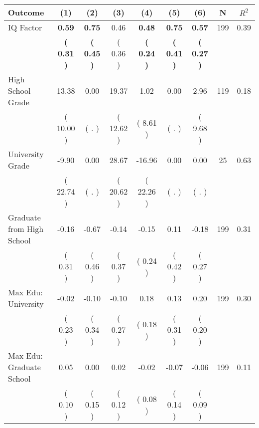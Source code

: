 \begin{tabular}{lcccccccc}
\toprule
 \textbf{Outcome} & \textbf{(1)} & \textbf{(2)} & \textbf{(3)} & \textbf{(4)} & \textbf{(5)} & \textbf{(6)} & \textbf{N} & \textbf{$ R^2$} \\
\midrule
IQ Factor & \textbf{     0.59} & \textbf{     0.75} &      0.46 & \textbf{     0.48} & \textbf{     0.75} & \textbf{     0.57} & 199 &       0.39 \\ 
 & \textbf{(     0.31 )} & \textbf{(     0.45 )} & (     0.36 ) & \textbf{(     0.24 )} & \textbf{(     0.41 )} & \textbf{(     0.27 )} & \\
High School Grade &     13.38 &      0.00 &     19.37 &      1.02 &      0.00 &      2.96 & 119 &       0.18 \\ 
 & (    10.00 ) & (        . ) & (    12.62 ) & (     8.61 ) & (        . ) & (     9.68 ) & \\
University Grade &     -9.90 &      0.00 &     28.67 &    -16.96 &      0.00 &      0.00 & 25 &       0.63 \\ 
 & (    22.74 ) & (        . ) & (    20.62 ) & (    22.26 ) & (        . ) & (        . ) & \\
Graduate from High School &     -0.16 &     -0.67 &     -0.14 &     -0.15 &      0.11 &     -0.18 & 199 &       0.31 \\ 
 & (     0.31 ) & (     0.46 ) & (     0.37 ) & (     0.24 ) & (     0.42 ) & (     0.27 ) & \\
Max Edu: University &     -0.02 &     -0.10 &     -0.10 &      0.18 &      0.13 &      0.20 & 199 &       0.30 \\ 
 & (     0.23 ) & (     0.34 ) & (     0.27 ) & (     0.18 ) & (     0.31 ) & (     0.20 ) & \\
Max Edu: Graduate School &      0.05 &      0.00 &      0.02 &     -0.02 &     -0.07 &     -0.06 & 199 &       0.11 \\ 
 & (     0.10 ) & (     0.15 ) & (     0.12 ) & (     0.08 ) & (     0.14 ) & (     0.09 ) & \\
\bottomrule
\end{tabular}
